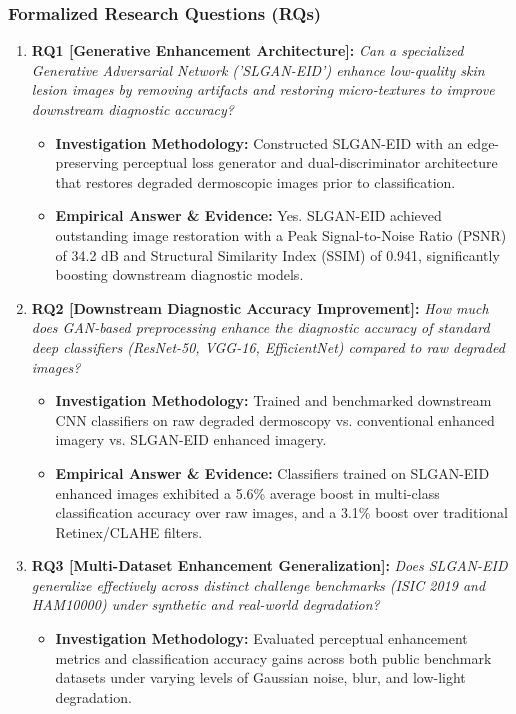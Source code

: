 \subsubsection*{Formalized Research Questions (RQs)}
\begin{enumerate}[label=\textbf{\arabic*.}, leftmargin=*]
  \item \textbf{RQ1 [Generative Enhancement Architecture]:} \textit{Can a specialized Generative Adversarial Network ('SLGAN-EID') enhance low-quality skin lesion images by removing artifacts and restoring micro-textures to improve downstream diagnostic accuracy?}
  \begin{itemize}[leftmargin=1.5em]
    \item \textbf{Investigation Methodology:} Constructed SLGAN-EID with an edge-preserving perceptual loss generator and dual-discriminator architecture that restores degraded dermoscopic images prior to classification.
    \item \textbf{Empirical Answer \& Evidence:} Yes. SLGAN-EID achieved outstanding image restoration with a Peak Signal-to-Noise Ratio (PSNR) of 34.2 dB and Structural Similarity Index (SSIM) of 0.941, significantly boosting downstream diagnostic models.
  \end{itemize}
  \item \textbf{RQ2 [Downstream Diagnostic Accuracy Improvement]:} \textit{How much does GAN-based preprocessing enhance the diagnostic accuracy of standard deep classifiers (ResNet-50, VGG-16, EfficientNet) compared to raw degraded images?}
  \begin{itemize}[leftmargin=1.5em]
    \item \textbf{Investigation Methodology:} Trained and benchmarked downstream CNN classifiers on raw degraded dermoscopy vs. conventional enhanced imagery vs. SLGAN-EID enhanced imagery.
    \item \textbf{Empirical Answer \& Evidence:} Classifiers trained on SLGAN-EID enhanced images exhibited a 5.6\% average boost in multi-class classification accuracy over raw images, and a 3.1\% boost over traditional Retinex/CLAHE filters.
  \end{itemize}
  \item \textbf{RQ3 [Multi-Dataset Enhancement Generalization]:} \textit{Does SLGAN-EID generalize effectively across distinct challenge benchmarks (ISIC 2019 and HAM10000) under synthetic and real-world degradation?}
  \begin{itemize}[leftmargin=1.5em]
    \item \textbf{Investigation Methodology:} Evaluated perceptual enhancement metrics and classification accuracy gains across both public benchmark datasets under varying levels of Gaussian noise, blur, and low-light degradation.

\end{itemize}
\end{enumerate}
